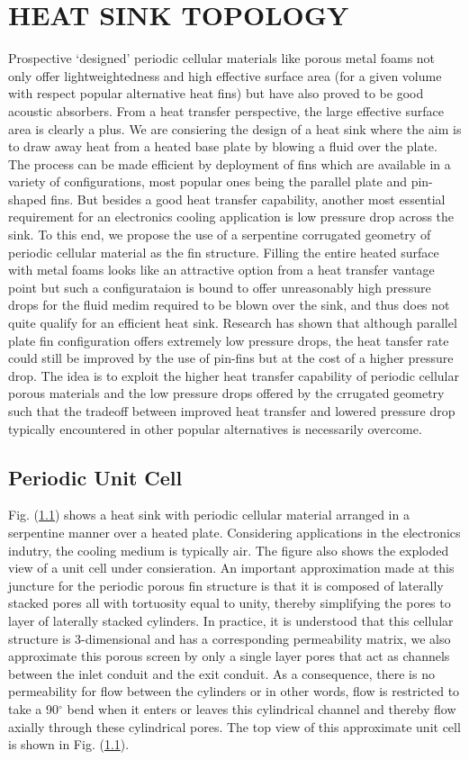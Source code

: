 \documentclass[twocolumn,10pt,cleanfoot]{ihmtc}
\begin{document}
\section{HEAT SINK TOPOLOGY}
%
Prospective `designed' periodic cellular materials like porous metal
foams not only offer lightweightedness and high effective surface
area (for a given volume with respect popular alternative heat fins)
but have also proved to be good acoustic absorbers. From a heat transfer
perspective, the large effective surface area is clearly a plus. We
are consiering the design of a heat sink where the aim is to draw
away heat from a heated base plate by blowing a fluid over the plate.
The process can be made efficient by deployment of fins which are
available in a variety of configurations, most popular ones being
the parallel plate and pin-shaped fins. But besides a good heat transfer
capability, another most essential requirement for an electronics
cooling application is low pressure drop across the sink. To this
end, we propose the use of a serpentine corrugated geometry of periodic
cellular material as the fin structure. Filling the entire heated
surface with metal foams looks like an attractive option from a heat
transfer vantage point but such a configurataion is bound to offer
unreasonably high pressure drops for the fluid medim required to be
blown over the sink, and thus does not quite qualify for an efficient
heat sink. Research has shown that although parallel plate fin configuration
offers extremely low pressure drops, the heat tansfer rate could still
be improved by the use of pin-fins but at the cost of a higher pressure
drop. The idea is to exploit the higher heat transfer capability of
periodic cellular porous materials and the low pressure drops offered
by the crrugated geometry such that the tradeoff between improved
heat transfer and lowered pressure drop typically encountered in other
popular alternatives is necessarily overcome.
%
\subsection{Periodic Unit Cell}
Fig. (\ref{}) shows a heat sink with periodic cellular material arranged in a serpentine manner over a heated plate. Considering applications in the electronics indutry, the cooling medium is typically air. The figure also shows the exploded view of a unit cell under consieration. An important approximation made at this juncture for the periodic porous fin structure is that it is composed of laterally stacked pores all with tortuosity equal to unity, thereby simplifying the pores to layer of laterally stacked cylinders. In practice, it is understood that this cellular structure is 3-dimensional and has a corresponding permeability matrix, we also approximate this porous screen by only a single layer pores that act as channels between the inlet conduit and the exit conduit. As a consequence, there is no permeability for flow between the cylinders or in other words, flow is restricted to take a 90$^\circ$ bend when it enters or leaves this cylindrical channel and thereby flow axially through these cylindrical pores. The top view of this approximate unit cell is shown in Fig. (\ref{}).
\end{document}
